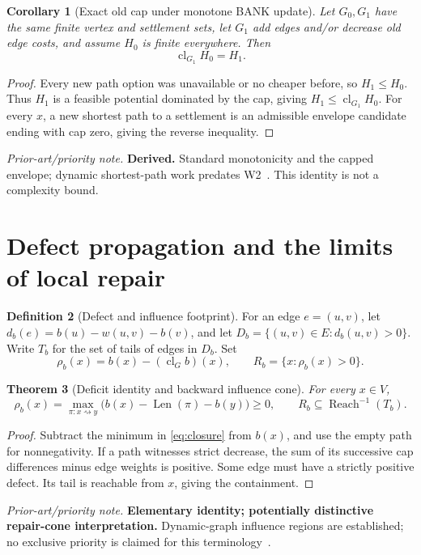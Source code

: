 \documentclass[11pt,letterpaper]{article}
\newtheorem{theorem}{Theorem}[section]
\newtheorem{corollary}[theorem]{Corollary}
\theoremstyle{definition}
\newtheorem{definition}[theorem]{Definition}
\theoremstyle{remark}
\newcommand{\Cl}{\operatorname{cl}}
\newcommand{\Len}{\operatorname{Len}}
\newcommand{\novel}[1]{\par\begingroup\small\textit{Prior-art/priority note.} #1\par\endgroup}
\begin{document}
\begin{corollary}[Exact old cap under monotone BANK update]\label{cor:monotone}
Let \(G_0,G_1\) have the same finite vertex and settlement sets, let \(G_1\) add edges and/or decrease old edge costs, and assume \(H_0\) is finite everywhere. Then
\begin{equation}\label{eq:oldnew}\Cl_{G_1}H_0=H_1.\end{equation}
\end{corollary}
\begin{proof}
Every new path option was unavailable or no cheaper before, so \(H_1\le H_0\). Thus \(H_1\) is a feasible potential dominated by the cap, giving \(H_1\le\Cl_{G_1}H_0\). For every \(x\), a new shortest path to a settlement is an admissible envelope candidate ending with cap zero, giving the reverse inequality.
\end{proof}
\novel{\textbf{Derived.} Standard monotonicity and the capped envelope; dynamic shortest-path work predates W2~\cite{Ramalingam1996,Koenig2004}. This identity is not a complexity bound.}

\section{Defect propagation and the limits of local repair}
\begin{definition}[Defect and influence footprint]
For an edge \(e=(u,v)\), let \(d_b(e)=b(u)-w(u,v)-b(v)\), and let \(D_b=\{(u,v)\in E:d_b(u,v)>0\}\). Write \(T_b\) for the set of tails of edges in \(D_b\). Set
\[
\rho_b(x)=b(x)-(\Cl_Gb)(x),\qquad R_b=\{x:\rho_b(x)>0\}.
\]
\end{definition}
\begin{theorem}[Deficit identity and backward influence cone]\label{thm:defect}
For every \(x\in V\),
\[
\rho_b(x)=\max_{\pi:x\rightsquigarrow y}\bigl(b(x)-\Len(\pi)-b(y)\bigr)\ge0,
\qquad R_b\subseteq\operatorname{Reach}^{-1}(T_b).
\]
\end{theorem}
\begin{proof}
Subtract the minimum in \eqref{eq:closure} from \(b(x)\), and use the empty path for nonnegativity. If a path witnesses strict decrease, the sum of its successive cap differences minus edge weights is positive. Some edge must have a strictly positive defect. Its tail is reachable from \(x\), giving the containment.
\end{proof}
\novel{\textbf{Elementary identity; potentially distinctive repair-cone interpretation.} Dynamic-graph influence regions are established; no exclusive priority is claimed for this terminology~\cite{Mohri,Ramalingam1996,Koenig2004}.}
\end{document}
